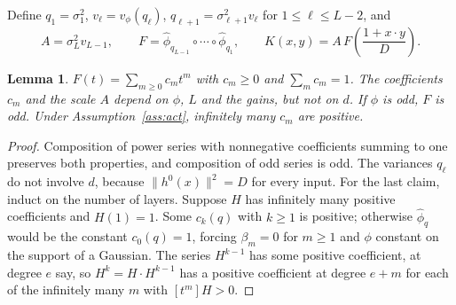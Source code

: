 \documentclass[11pt]{article}
\newtheorem{lemma}[theorem]{Lemma}
\theoremstyle{definition}\newtheorem{assumption}[theorem]{Assumption}
\theoremstyle{remark}\newtheorem{remark}[theorem]{Remark}
\begin{document}
Define $q_1=\sigma_1^2$, $v_\ell=v_\phi(q_\ell)$,
$q_{\ell+1}=\sigma_{\ell+1}^2v_\ell$ for $1\le\ell\le L-2$, and
\begin{equation}\label{eq:kernel}
 A=\sigma_L^2v_{L-1},\qquad
 F=\widehat\phi_{q_{L-1}}\circ\cdots\circ\widehat\phi_{q_1},\qquad
 K(x,y)=A\,F\!\left(\frac{1+x\cdot y}D\right).
\end{equation}
\begin{lemma}\label{lem:composite}
$F(t)=\sum_{m\ge0}c_mt^m$ with $c_m\ge0$ and $\sum_mc_m=1$. The
coefficients $c_m$ and the scale $A$ depend on $\phi$, $L$ and the gains,
but not on $d$. If $\phi$ is odd, $F$ is odd. Under
Assumption~\ref{ass:act}, infinitely many $c_m$ are positive.
\end{lemma}
\begin{proof}
Composition of power series with nonnegative coefficients summing to one
preserves both properties, and composition of odd series is odd. The
variances $q_\ell$ do not involve $d$, because $\|h^0(x)\|^2=D$ for every
input. For the last claim, induct on the number of layers. Suppose $H$ has
infinitely many positive coefficients and $H(1)=1$. Some $c_k(q)$ with
$k\ge1$ is positive; otherwise $\widehat\phi_q$ would be the constant
$c_0(q)=1$, forcing $\beta_m=0$ for $m\ge1$ and $\phi$ constant on the
support of a Gaussian. The series $H^{k-1}$ has some positive coefficient,
at degree $e$ say, so $H^k=H\cdot H^{k-1}$ has a positive coefficient at
degree $e+m$ for each of the infinitely many $m$ with $[t^m]H>0$.
\end{proof}
\end{document}
